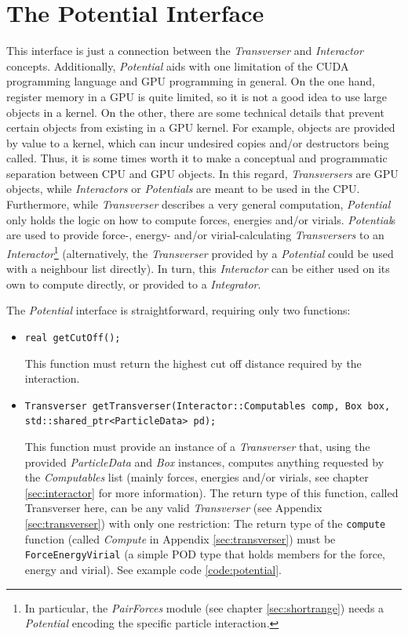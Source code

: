 \documentclass[twoside,openright,titlepage,numbers=noenddot,%
headinclude,footinclude,cleardoublepage=empty,abstract=on,
BCOR=5mm,fontsize=11pt, dvipsnames, paper=b5
]{scrreprt}
\def\ucpp{uammd_cpp_lexer.py:UAMMDCppLexer -x}
\newcommand{\gpu}{\gls{GPU}\xspace}
\begin{document}
\section{The Potential Interface} \label{sec:potential}

This interface is just a connection between the \emph{Transverser} and \emph{Interactor} concepts. Additionally, \emph{Potential} aids with one limitation of the CUDA programming language and \gls{GPU} programming in general. On the one hand, register memory in a \gpu is quite limited, so it is not a good idea to use large objects in a kernel. On the other, there are some technical details that prevent certain objects from existing in a \gpu kernel. For example, objects are provided by value to a kernel, which can incur undesired copies and/or destructors being called. Thus, it is some times worth it to make a conceptual and programmatic separation between CPU and \gpu objects.
In this regard, \emph{Transversers} are \gpu objects, while \emph{Interactors} or \emph{Potentials} are meant to be used in the CPU.
Furthermore, while \emph{Transverser} describes a very general computation, \emph{Potential} only holds the logic on how to compute forces, energies and/or virials.
\emph{Potential}s are used to provide force-, energy- and/or virial-calculating \emph{Transversers} to an \emph{Interactor}\footnote{In particular, the \emph{PairForces} module (see chapter \ref{sec:shortrange}) needs a \emph{Potential} encoding the specific particle interaction.} (alternatively, the \emph{Transverser} provided by a \emph{Potential} could be used with a neighbour list directly). In turn, this \emph{Interactor} can be either used on its own to compute directly, or provided to a \emph{Integrator}. %

The \emph{Potential} interface is straightforward, requiring only two functions:
\begin{itemize}
\item \texttt{real getCutOff();}
  
  This function must return the highest cut off distance required by the interaction.
\item \texttt{Transverser getTransverser(Interactor::Computables comp, Box box, std::shared_ptr<ParticleData> pd);}
  
  This function must provide an instance of a \emph{Transverser} that, using the provided \emph{ParticleData} and \emph{Box} instances, computes anything requested by the \emph{Computables} list (mainly forces, energies and/or virials, see chapter \ref{sec:interactor} for more information).
  The return type of this function, called Transverser here, can be any valid \emph{Transverser} (see Appendix \ref{sec:transverser}) with only one restriction: The return type of the \texttt{compute} function (called \emph{Compute} in Appendix \ref{sec:transverser}) must be \texttt{ForceEnergyVirial} (a simple POD type that holds members for the force, energy and virial). See example code \ref{code:potential}.
\end{itemize}
\end{document}
